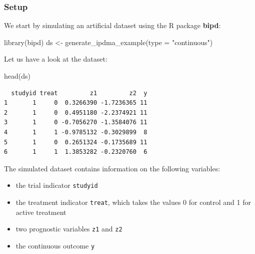 \documentclass[
  letterpaper,
  DIV=11,
  numbers=noendperiod]{scrreprt}
\newenvironment{Shaded}{\begin{snugshade}}{\end{snugshade}}
\newcommand{\AttributeTok}[1]{\textcolor[rgb]{0.40,0.45,0.13}{#1}}
\newcommand{\FunctionTok}[1]{\textcolor[rgb]{0.28,0.35,0.67}{#1}}
\newcommand{\NormalTok}[1]{\textcolor[rgb]{0.00,0.23,0.31}{#1}}
\newcommand{\OtherTok}[1]{\textcolor[rgb]{0.00,0.23,0.31}{#1}}
\newcommand{\StringTok}[1]{\textcolor[rgb]{0.13,0.47,0.30}{#1}}
\providecommand{\tightlist}{%
  \setlength{\itemsep}{0pt}\setlength{\parskip}{0pt}}\usepackage{longtable,booktabs,array}
\begin{document}
\hypertarget{setup}{%
\subsubsection{Setup}\label{setup}}

We start by simulating an artificial dataset using the R package
\textbf{bipd}:

\begin{Shaded}
\begin{Highlighting}[]
\FunctionTok{library}\NormalTok{(bipd)}
\NormalTok{ds }\OtherTok{\textless{}{-}} \FunctionTok{generate\_ipdma\_example}\NormalTok{(}\AttributeTok{type =} \StringTok{"continuous"}\NormalTok{)}
\end{Highlighting}
\end{Shaded}

Let us have a look at the dataset:

\begin{Shaded}
\begin{Highlighting}[]
\FunctionTok{head}\NormalTok{(ds)}
\end{Highlighting}
\end{Shaded}

\begin{verbatim}
  studyid treat         z1         z2  y
1       1     0  0.3266390 -1.7236365 11
2       1     0  0.4951180 -2.2374921 11
3       1     0 -0.7056270 -1.3584076 11
4       1     1 -0.9785132 -0.3029899  8
5       1     0  0.2651324 -0.1735689 11
6       1     1  1.3853282 -0.2320760  6
\end{verbatim}

The simulated dataset contains information on the following variables:

\begin{itemize}
\tightlist
\item
  the trial indicator \texttt{studyid}
\item
  the treatment indicator \texttt{treat}, which takes the values 0 for
  control and 1 for active treatment
\item
  two prognostic variables \texttt{z1} and \texttt{z2}
\item
  the continuous outcome \texttt{y}
\end{itemize}
\end{document}
